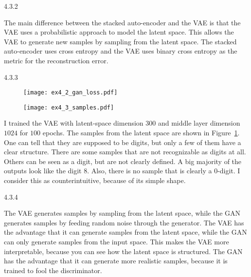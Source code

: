 \begin{task}{4.3.2}
\end{task}

The main difference between the stacked auto-encoder and the VAE is that the VAE uses a
probabilistic approach to model the latent space. This allows the VAE to generate new samples by
sampling from the latent space. The stacked auto-encoder uses cross entropy and the VAE uses binary
cross entropy as the metric for the reconstruction error.


\begin{task}{4.3.3}
\end{task}

\begin{figure}[t]
  \centering
  \begin{minipage}{0.6\textwidth}
    \centering
    \texttt{[image: ex4\_2\_gan\_loss.pdf]}
    \label{fig:ex4_2_gan_loss}
  \end{minipage}
  \begin{minipage}{0.39\textwidth}
    \centering
    \texttt{[image: ex4\_3\_samples.pdf]}
    \label{fig:ex4_3_samples}
  \end{minipage}
\end{figure}

I trained the VAE with latent-space dimension $300$ and middle layer dimension $1024$ for $100$
epochs. The samples from the latent space are shown in Figure~\ref{fig:ex4_3_samples}. One can tell
that they are supposed to be digits, but only a few of them have a clear structure. There are some
samples that are not recognizable as digits at all. Others can be seen as a digit, but are not
clearly defined. A big majority of the outputs look like the digit $8$. Also, there is no sample
that is clearly a $0$-digit. I consider this as counterintuitive, because of its simple shape.


\begin{task}{4.3.4}
\end{task}

The VAE generates samples by sampling from the latent space, while the GAN generates samples by
feeding random noise through the generator. The VAE has the advantage that it can generate samples
from the latent space, while the GAN can only generate samples from the input space. This makes the
VAE more interpretable, because you can see how the latent space is structured. The GAN has the
advantage that it can generate more realistic samples, because it is trained to fool the
discriminator.